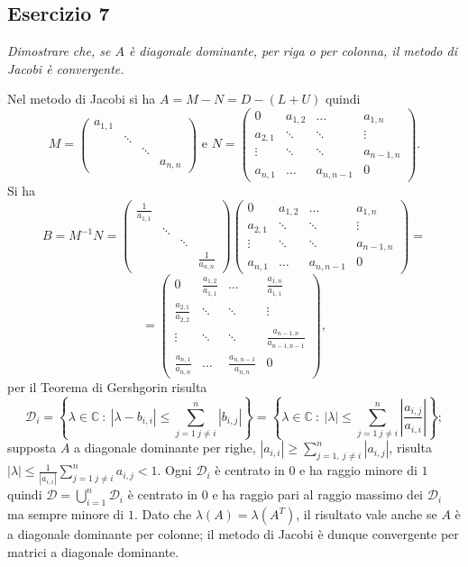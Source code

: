 \subsection{Esercizio 7}
\label{sub:es7}
\emph{Dimostrare che, se $A$ è diagonale dominante, per riga o per colonna, il metodo di Jacobi è convergente.}
\begin{sol}
  Nel metodo di Jacobi si ha $A=M-N=D-(L+U)$ quindi
   $$M=\begin{pmatrix}a_{1,1}&&&\\&\ddots&&\\&&\ddots&\\&&&a_{n,n}\end{pmatrix}\mbox{ e } N=\begin{pmatrix}0&a_{1,2}&\ldots&a_{1,n}\\a_{2,1}&\ddots&\ddots&\vdots\\\vdots&\ddots&\ddots&a_{n-1,n}\\a_{n,1}&\ldots&a_{n,n-1}&0\end{pmatrix}.$$
   Si ha $$B=M^{-1}N=\begin{pmatrix}\frac{1}{a_{1,1}}&&&\\&\ddots&&\\&&\ddots&\\&&&\frac{1}{a_{n,n}}\end{pmatrix}\begin{pmatrix}0&a_{1,2}&\ldots&a_{1,n}\\a_{2,1}&\ddots&\ddots&\vdots\\\vdots&\ddots&\ddots&a_{n-1,n}\\
   a_{n,1}&\ldots&a_{n,n-1}&0\end{pmatrix}=$$$$=\begin{pmatrix}0&\frac{a_{1,2}}{a_{1,1}}&\ldots&\frac{a_{1,n}}{a_{1,1}}\\\frac{a_{2,1}}{a_{2,2}}&\ddots&\ddots&\vdots\\\vdots&\ddots&\ddots&\frac{a_{n-1,n}}{a_{n-1,n-1}}\\\frac{a_{n,1}}{a_{n,n}}&\ldots&\frac{a_{n,n-1}}{a_{n,n}}&0\end{pmatrix},$$
   per il Teorema di Gershgorin risulta
   $$\mathcal{D}_i=\left\{\lambda\in\mathbb{C}\::\:|\lambda-b_{i,i}|\leq\sum_{j=1\: j\neq i}^{n}{|b_{i,j}|}\right\}=\left\{\lambda\in\mathbb{C}\::\:|\lambda|\leq\sum_{j=1\: j\neq i}^{n}{\left|\frac{a_{i,j}}{a_{i,i}}\right|}\right\};$$
   supposta $A$ a diagonale dominante per righe, $|a_{i,i}|\geq\sum_{j=1,\: j\neq i}^n{|a_{i,j}|}$,
   risulta $|\lambda|\leq\frac{1}{|a_{i,i}|}\sum_{j=1\: j\neq i}^{n}{a_{i,j}}<1$. Ogni $\mathcal{D}_i$ è centrato in $0$ e ha raggio minore di $1$ quindi $\mathcal{D}=\bigcup_{i=1}^{n}{\mathcal{D}_i}$ è centrato in $0$ e ha raggio pari al raggio massimo dei $\mathcal{D}_i$ ma sempre minore di $1$. Dato che $\lambda(A)=\lambda(A^T)$,
   il risultato vale anche se $A$ è a diagonale dominante per colonne; il metodo di Jacobi è dunque convergente per matrici a diagonale dominante.
\end{sol}

